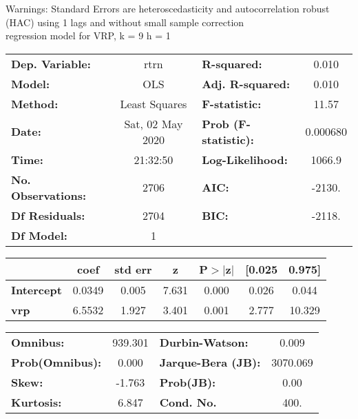 Warnings: \newline
 [1] Standard Errors are heteroscedasticity and autocorrelation robust (HAC) using 1 lags and without small sample correction\\ 

regression model for VRP, k = 9 h = 1\begin{center}
\begin{tabular}{lclc}
\toprule
\textbf{Dep. Variable:}    &       rtrn       & \textbf{  R-squared:         } &     0.010   \\
\textbf{Model:}            &       OLS        & \textbf{  Adj. R-squared:    } &     0.010   \\
\textbf{Method:}           &  Least Squares   & \textbf{  F-statistic:       } &     11.57   \\
\textbf{Date:}             & Sat, 02 May 2020 & \textbf{  Prob (F-statistic):} &  0.000680   \\
\textbf{Time:}             &     21:32:50     & \textbf{  Log-Likelihood:    } &    1066.9   \\
\textbf{No. Observations:} &        2706      & \textbf{  AIC:               } &    -2130.   \\
\textbf{Df Residuals:}     &        2704      & \textbf{  BIC:               } &    -2118.   \\
\textbf{Df Model:}         &           1      & \textbf{                     } &             \\
\bottomrule
\end{tabular}
\begin{tabular}{lcccccc}
                   & \textbf{coef} & \textbf{std err} & \textbf{z} & \textbf{P$> |$z$|$} & \textbf{[0.025} & \textbf{0.975]}  \\
\midrule
\textbf{Intercept} &       0.0349  &        0.005     &     7.631  &         0.000        &        0.026    &        0.044     \\
\textbf{vrp}       &       6.5532  &        1.927     &     3.401  &         0.001        &        2.777    &       10.329     \\
\bottomrule
\end{tabular}
\begin{tabular}{lclc}
\textbf{Omnibus:}       & 939.301 & \textbf{  Durbin-Watson:     } &    0.009  \\
\textbf{Prob(Omnibus):} &   0.000 & \textbf{  Jarque-Bera (JB):  } & 3070.069  \\
\textbf{Skew:}          &  -1.763 & \textbf{  Prob(JB):          } &     0.00  \\
\textbf{Kurtosis:}      &   6.847 & \textbf{  Cond. No.          } &     400.  \\
\bottomrule
\end{tabular}
\end{center}

